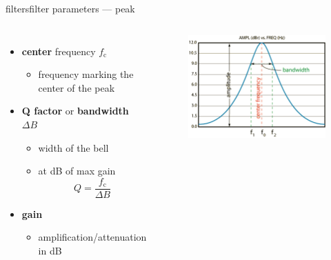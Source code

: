         \begin{frame}{filters}{filter parameters --- peak}
            \begin{columns}
                \begin{itemize}
                    \item   \textbf{center} frequency $f_\mathrm{c}$
                        \begin{itemize}
                            \item   frequency marking the center of the peak
                        \end{itemize}
                    \smallskip
                    \item   \textbf{Q factor} or \textbf{bandwidth} $\Delta B$
                        \begin{itemize}
                            \item   width of the bell
                            \item   at \unit[-3]{dB} of max gain
                            \[Q = \frac{f_\mathrm{c}}{\Delta B}\]
                        \end{itemize}
                    \smallskip
                    \item   \textbf{gain}    
                        \begin{itemize}
                            \item   amplification/attenuation in dB
                        \end{itemize}
                \end{itemize}
                \begin{figure}%
                    \includegraphics[width=.9\columnwidth]{graph/filter_parameters_peak}%
                \end{figure}
            \end{columns}
        \end{frame}
